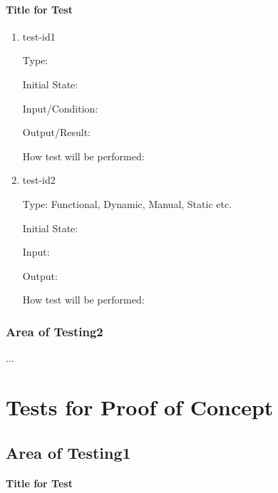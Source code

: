 \documentclass[12pt, titlepage]{article}
\begin{document}
		\paragraph{Title for Test}

		\begin{enumerate}

			\item{test-id1\\}

			Type: 
								
			Initial State: 
								
			Input/Condition: 
								
			Output/Result: 
								
			How test will be performed: 
								
			\item{test-id2\\}

			Type: Functional, Dynamic, Manual, Static etc.
								
			Initial State: 
								
			Input: 
								
			Output: 
								
			How test will be performed: 

		\end{enumerate}

	\subsubsection{Area of Testing2}

...

\section{Tests for Proof of Concept}

	\subsection{Area of Testing1}
				
		\paragraph{Title for Test}
\end{document}
